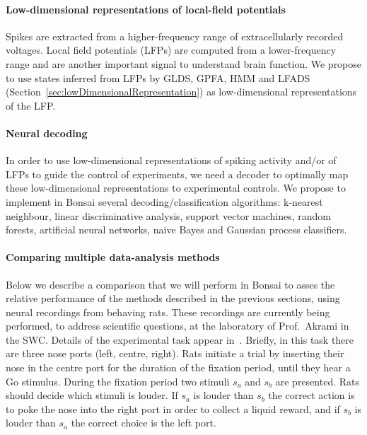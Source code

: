 \paragraph{Low-dimensional representations of local-field potentials}
\label{sec:lowDimensionalRepresentationsOfLFPs}

Spikes are extracted from a higher-frequency range of extracellularly recorded
voltages. Local field potentials (LFPs) are computed from a lower-frequency
range and are another important signal to understand brain function. We propose
to use states inferred from LFPs by GLDS, GPFA, HMM and LFADS
(Section~\ref{sec:lowDimensionalRepresentation}) as
low-dimensional representations of the LFP.

\paragraph{Neural decoding}
\label{sec:neuralDecoding}

In order to use low-dimensional representations of spiking activity and/or of
LFPs to guide the control of experiments, we need a decoder to optimally map
these low-dimensional representations to experimental controls.
%
We propose to implement in Bonsai several decoding/classification algorithms:
k-nearest neighbour, linear discriminative analysis, support vector machines,
random forests, artificial neural networks, naive Bayes and Gaussian process
classifiers.

\paragraph{Comparing multiple data-analysis methods}
\label{sec:comparisonOfMultipleMethods}


Below we describe a comparison that we
will perform in Bonsai to asses the relative performance of the methods
described in the previous sections, using neural recordings from behaving rats.
These recordings are currently being performed, to address scientific questions,
at the laboratory of Prof.~Akrami in the SWC.
%
Details of the experimental task appear in~\citet{akramiEtAl18}.
%
Briefly, in this task there are three nose ports (left, centre, right). Rats
initiate a trial by inserting their nose in the centre port for the duration of
the fixation period, until they hear a Go stimulus. During the fixation period
two stimuli $s_a$ and $s_b$ are presented. Rats should decide which stimuli is
louder. If $s_a$ is louder than $s_b$ the correct action is to poke the nose
into the right port in order to collect a liquid reward, and if $s_b$ is louder
than $s_a$ the correct choice is the left port.


